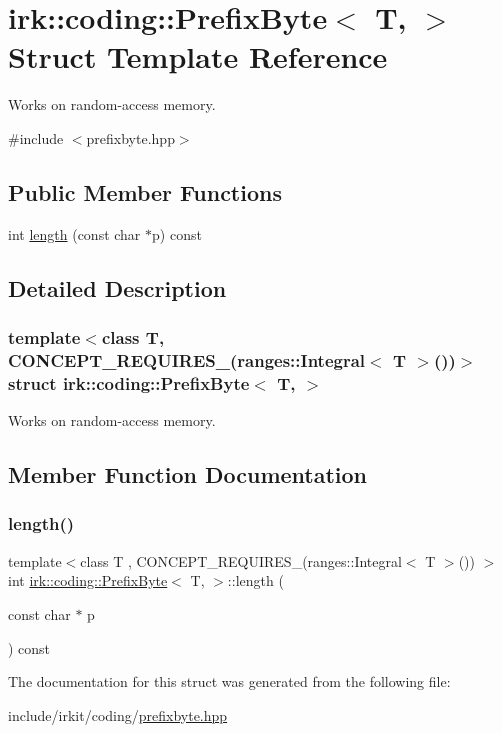 \hypertarget{structirk_1_1coding_1_1PrefixByte}{}\section{irk\+:\+:coding\+:\+:Prefix\+Byte$<$ T, $>$ Struct Template Reference}
\label{structirk_1_1coding_1_1PrefixByte}


Works on random-\/access memory.  




{\ttfamily \#include $<$prefixbyte.\+hpp$>$}

\subsection*{Public Member Functions}
\begin{DoxyCompactItemize}
\item 
int \mbox{\hyperlink{structirk_1_1coding_1_1PrefixByte_aa2145dda2e035772a106db8e90e510e2}{length}} (const char $\ast$p) const
\end{DoxyCompactItemize}


\subsection{Detailed Description}
\subsubsection*{template$<$class T, C\+O\+N\+C\+E\+P\+T\+\_\+\+R\+E\+Q\+U\+I\+R\+E\+S\+\_\+(ranges\+::\+Integral$<$ T $>$())$>$\newline
struct irk\+::coding\+::\+Prefix\+Byte$<$ T, $>$}

Works on random-\/access memory. 

\subsection{Member Function Documentation}
\mbox{\label{structirk_1_1coding_1_1PrefixByte_aa2145dda2e035772a106db8e90e510e2}} 
\subsubsection{\texorpdfstring{length()}{length()}}
{\footnotesize\ttfamily template$<$class T , C\+O\+N\+C\+E\+P\+T\+\_\+\+R\+E\+Q\+U\+I\+R\+E\+S\+\_\+(ranges\+::\+Integral$<$ T $>$()) $>$ \\
int \mbox{\hyperlink{structirk_1_1coding_1_1PrefixByte}{irk\+::coding\+::\+Prefix\+Byte}}$<$ T, $>$\+::length (\begin{DoxyParamCaption}\item[{const char $\ast$}]{p }\end{DoxyParamCaption}) const\hspace{0.3cm}{\ttfamily [inline]}}



The documentation for this struct was generated from the following file\+:\begin{DoxyCompactItemize}
\item 
include/irkit/coding/\mbox{\hyperlink{prefixbyte_8hpp}{prefixbyte.\+hpp}}\end{DoxyCompactItemize}
